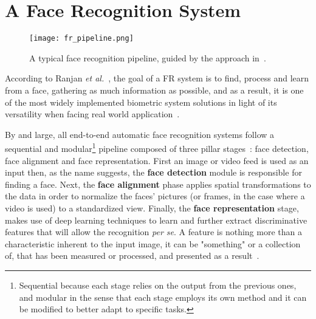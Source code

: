 \documentclass[class=report, crop=false, a4paper, 12pt]{standalone}
\begin{document}
\newpage
\section{A Face Recognition System}

\begin{figure}[!h]
    \texttt{[image: fr\_pipeline.png]}
    \caption[Pipeline]{A typical face recognition pipeline, guided by the approach in~\autocite{wangDeepFaceRecognition2021}.}
    \label{fig:fr pipeline}
\end{figure}

\par According to Ranjan \textit{et al.}~\autocite{ranjanDeepLearningUnderstanding2018}, the goal of a FR system is to find, process and learn from a face, gathering as much information as possible, and as a result, it is one of the most widely implemented biometric system solutions in light of its versatility when facing real world application~\autocite{duElementsEndtoendDeep2022}.

\par By and large, all end-to-end automatic face recognition systems follow a sequential and modular\footnote{Sequential because each stage relies on the output from the previous ones, and modular in the sense that each stage employs its own method and it can be modified to better adapt to specific tasks.} pipeline  composed of three pillar stages~\autocite{wangDeepFaceRecognition2021}: face detection, face alignment and face representation. First an image or video feed is used as an input then, as the name suggests, the \textbf{face detection} module is responsible for finding a face. Next, the \textbf{face alignment} phase applies spatial transformations to the data in order to normalize the faces' pictures (or frames, in the case where a video is used) to a standardized view. Finally, the \textbf{face representation} stage, makes use of deep learning techniques to learn and further extract discriminative features that will allow the recognition \textit{per se}. A feature is nothing more than a characteristic inherent to the input image, it can be "something" or a collection of, that has been measured or processed, and presented as a result~\autocite{Goodfellow-et-al-2016}.
\end{document}
